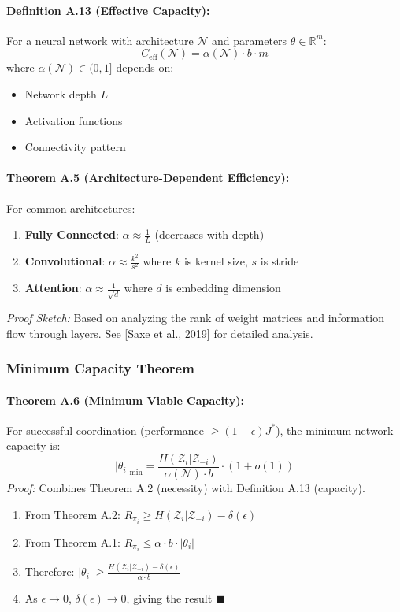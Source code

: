 \documentclass[10pt, letterpaper]{article}
\begin{document}
\paragraph{Definition A.13 (Effective Capacity):} For a neural network with architecture $\mathcal{N}$ and parameters $\theta \in \mathbb{R}^m$:
\[C_{\text{eff}}(\mathcal{N}) = \alpha(\mathcal{N}) \cdot b \cdot m\]
where $\alpha(\mathcal{N}) \in (0,1]$ depends on:
\begin{itemize}
    \item Network depth $L$
    \item Activation functions
    \item Connectivity pattern
\end{itemize}

\paragraph{Theorem A.5 (Architecture-Dependent Efficiency):} For common architectures:
\begin{enumerate}
    \item \textbf{Fully Connected}: $\alpha \approx \frac{1}{L}$ (decreases with depth)
    \item \textbf{Convolutional}: $\alpha \approx \frac{k^2}{s^2}$ where $k$ is kernel size, $s$ is stride
    \item \textbf{Attention}: $\alpha \approx \frac{1}{\sqrt{d}}$ where $d$ is embedding dimension
\end{enumerate}
\emph{Proof Sketch:} Based on analyzing the rank of weight matrices and information flow through layers. See [Saxe et al., 2019] for detailed analysis.

\subsubsection{Minimum Capacity Theorem}

\paragraph{Theorem A.6 (Minimum Viable Capacity):} For successful coordination (performance $\geq (1-\epsilon)J^*$), the minimum network capacity is:
\[|\theta_i|_{\min} = \frac{H(\mathcal{Z}_i | \mathcal{Z}_{-i})}{\alpha(\mathcal{N}) \cdot b} \cdot (1 + o(1))\]
\emph{Proof:} Combines Theorem A.2 (necessity) with Definition A.13 (capacity).
\begin{enumerate}
    \item From Theorem A.2: $R_{\pi_i} \geq H(\mathcal{Z}_i | \mathcal{Z}_{-i}) - \delta(\epsilon)$
    \item From Theorem A.1: $R_{\pi_i} \leq \alpha \cdot b \cdot |\theta_i|$
    \item Therefore: $|\theta_i| \geq \frac{H(\mathcal{Z}_i | \mathcal{Z}_{-i}) - \delta(\epsilon)}{\alpha \cdot b}$
    \item As $\epsilon \to 0$, $\delta(\epsilon) \to 0$, giving the result $\blacksquare$
\end{enumerate}
\end{document}
